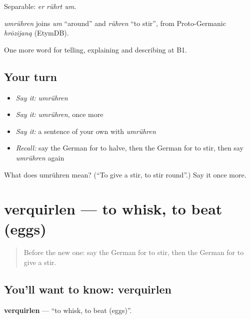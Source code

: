 Separable: \emph{er rührt um}.

\begin{cousinweb}
\emph{umrühren} joins \emph{um} \textquotedblleft{}around\textquotedblright{} and \emph{rühren} \textquotedblleft{}to stir\textquotedblright{}, from Proto-Germanic \emph{hrōzijaną} (EtymDB).
\end{cousinweb}

\begin{grammarlens}[title={What you've built}]
One more word for telling, explaining and describing at B1.
\end{grammarlens}

\subsection*{Your turn}
\begin{itemize}
\raggedright
  \item \emph{Say it:} \emph{umrühren}
  \item \emph{Say it:} \emph{umrühren}, once more
  \item \emph{Say it:} a sentence of your own with \emph{umrühren}
  \item \emph{Recall:} say the German for to halve, then the German for to stir, then say \emph{umrühren} again
\end{itemize}

\begin{tcolorbox}[breakable,colback=teal!4,colframe=teal!35!black,title={Before you move on}]
What does umrühren mean? (\textquotedblleft{}To give a stir, to stir round\textquotedblright{}.) Say it once more.
\end{tcolorbox}
\section[verquirlen]{verquirlen — to whisk, to beat (eggs)}

\label{lesson:GE-C324-verquirlen}



\begin{quote}
Before the new one: say the German for to stir, then the German for to give a stir.
\end{quote}

\subsection*{You'll want to know: verquirlen}
\textbf{verquirlen} — \textquotedblleft{}to whisk, to beat (eggs)\textquotedblright{}.

